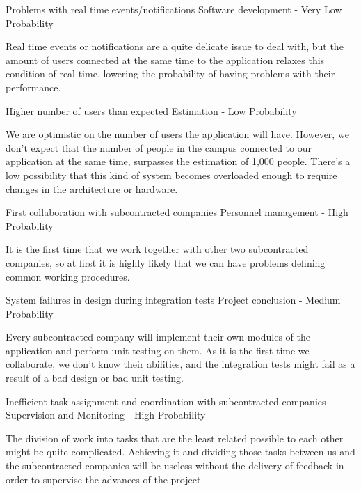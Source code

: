 \begin{risk}{Problems with real time events/notifications}
\riskcat Software development
 - Very Low Probability 

Real time events or notifications are a quite delicate issue to deal with, but the amount of users connected at the same time to the application relaxes this condition of real time, lowering the probability of having problems with their performance.
\end{risk}

\begin{risk}{Higher number of users than expected}
\riskcat Estimation
 - Low Probability 

We are optimistic on the number of users the application will have. However, we don't expect that the number of people in the campus connected to our application at the same time, surpasses the estimation of 1,000 people. There's a low possibility that this kind of system becomes overloaded enough to require changes in the architecture or hardware.
\end{risk}

\begin{risk}{First collaboration with subcontracted companies}
\riskcat Personnel management
 - High Probability 

It is the first time that we work together with other two subcontracted companies, so at first it is highly likely that we can have problems defining common working procedures.
\end{risk}

\begin{risk}{System failures in design during integration tests}
\riskcat Project conclusion
 - Medium Probability 

Every subcontracted company will implement their own modules of the application and perform unit testing on them. As it is the first time we collaborate, we don't know their abilities, and the integration tests might fail as a result of a bad design or bad unit testing.
\end{risk}

\begin{risk}{Inefficient task assignment and coordination with subcontracted companies}
\riskcat Supervision and Monitoring
 - High Probability 

The division of work into tasks that are the least related possible to each other might be quite complicated. Achieving it and dividing those tasks between us and the subcontracted companies will be useless without the delivery of feedback in order to supervise the advances of the project.
\end{risk}

